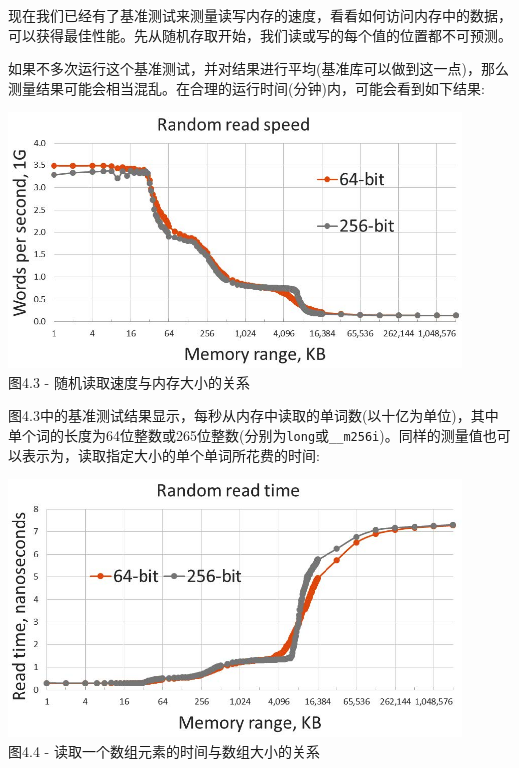 
现在我们已经有了基准测试来测量读写内存的速度，看看如何访问内存中的数据，可以获得最佳性能。先从随机存取开始，我们读或写的每个值的位置都不可预测。


如果不多次运行这个基准测试，并对结果进行平均(基准库可以做到这一点)，那么测量结果可能会相当混乱。在合理的运行时间(分钟)内，可能会看到如下结果:

\begin{center}
\includegraphics[width=0.9\textwidth]{content/1/chapter4/images/3.jpg}\\
图4.3 - 随机读取速度与内存大小的关系
\end{center}

图4.3中的基准测试结果显示，每秒从内存中读取的单词数(以十亿为单位)，其中单个词的长度为64位整数或265位整数(分别为\texttt{long}或\texttt{\_\_m256i})。同样的测量值也可以表示为，读取指定大小的单个单词所花费的时间:

\begin{center}
\includegraphics[width=0.9\textwidth]{content/1/chapter4/images/4.jpg}\\
图4.4 - 读取一个数组元素的时间与数组大小的关系
\end{center}

